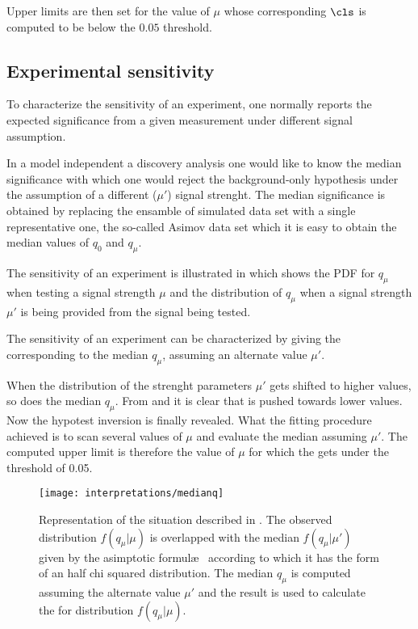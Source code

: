 Upper limits are then set for the value of $\mu$ whose corresponding $\cls$ is computed to be below the $0.05$ threshold.

\subsection{Experimental sensitivity}
\label{sec:sensitivity}
To characterize the sensitivity of an experiment, one normally reports the expected significance from a given measurement under different signal assumption.


In a model independent a discovery analysis one would like to know the median significance with which one would reject the background-only hypothesis under the assumption of a different ($\mu'$) signal strenght. The median significance is obtained by replacing the ensamble of simulated data set with a single representative one, the so-called Asimov data set which it is easy to obtain the median values of $q_0$ and $q_\mu$.

The sensitivity of an experiment is illustrated in \Fig{\ref{fig:medianq}} which shows the PDF for $q_\mu$ when testing a signal strength $\mu$ and the distribution of $q_\mu$ when a signal strength $\mu'$ is being provided from the signal being tested.

The sensitivity of an experiment can be characterized by giving the \p corresponding to the median $q_\mu$, assuming an alternate value $\mu'$. 

When the distribution of the strenght parameters $\mu'$ gets shifted to higher values, so does the median $q_\mu$. From \Eqn{\ref{eqn:pdaq0}} and \Eqn{\ref{eqn:pdaqmu}} it is clear that \p is pushed towards lower values. Now the hypotest inversion is finally revealed. What the fitting procedure achieved is to scan several values of $\mu$ and evaluate the median \p assuming $\mu'$. The computed upper limit is therefore the value of $\mu$ for which the \p gets under the threshold of \num{0.05}.

\begin{figure}[pt]
\centering
\texttt{[image: interpretations/medianq]}
\caption{Representation of the situation described in \Sect{\ref{sec:sensitivity}}. The observed distribution $f(q_\mu \vert \mu)$ is overlapped with the median $f(q_\mu \vert \mu')$ given by the asimptotic formul\ae~ according to which it has the form of an half chi squared distribution. The median $q_\mu$ is computed assuming the alternate value $\mu'$ and the result is used to calculate the \p for distribution $f(q_\mu \vert \mu)$.}
\label{fig:medianq}
\end{figure}

